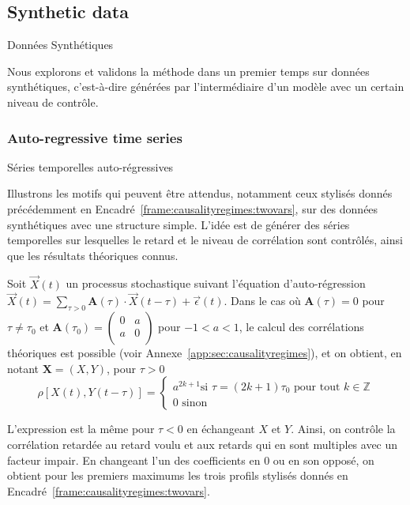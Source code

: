 


\subsection{Synthetic data}{Données Synthétiques}

Nous explorons et validons la méthode dans un premier temps sur données synthétiques, c'est-à-dire générées par l'intermédiaire d'un modèle avec un certain niveau de contrôle.


\subsubsection{Auto-regressive time series}{Séries temporelles auto-régressives}

Illustrons les motifs qui peuvent être attendus, notamment ceux stylisés donnés précédemment en Encadré~\ref{frame:causalityregimes:twovars}, sur des données synthétiques avec une structure simple. L'idée est de générer des séries temporelles sur lesquelles le retard et le niveau de corrélation sont contrôlés, ainsi que les résultats théoriques connus.


Soit $\vec{X}(t)$ un processus stochastique suivant l'équation d'auto-régression $\vec{X}(t) = \sum_{\tau > 0} \mathbf{A}(\tau) \cdot \vec{X}(t - \tau ) + \vec{\epsilon}(t)$. Dans le cas où $\mathbf{A}(\tau) = 0$ pour $\tau \neq \tau_0$ et $\mathbf{A}(\tau_0) = \left( {\begin{array}{cc} 0 & a \\ a & 0 \\ \end{array}} \right)$ pour $-1<a<1$, le calcul des corrélations théoriques est possible (voir Annexe~\ref{app:sec:causalityregimes}), et on obtient, en notant $\mathbf{X} = (X,Y)$, pour $\tau > 0$
\[
\rho\left[X(t),Y(t-\tau)\right] = \begin{cases}
	a^{2k+1} \textrm{si } \tau = (2k+1)\tau_0\textrm{ pour tout }k\in \mathbb{Z} \\
	0 \textrm{ sinon} 
\end{cases}
\]

L'expression est la même pour $\tau<0$ en échangeant $X$ et $Y$. Ainsi, on contrôle la corrélation retardée au retard voulu et aux retards qui en sont multiples avec un facteur impair. En changeant l'un des coefficients en 0 ou en son opposé, on obtient pour les premiers maximums les trois profils stylisés donnés en Encadré~\ref{frame:causalityregimes:twovars}.


